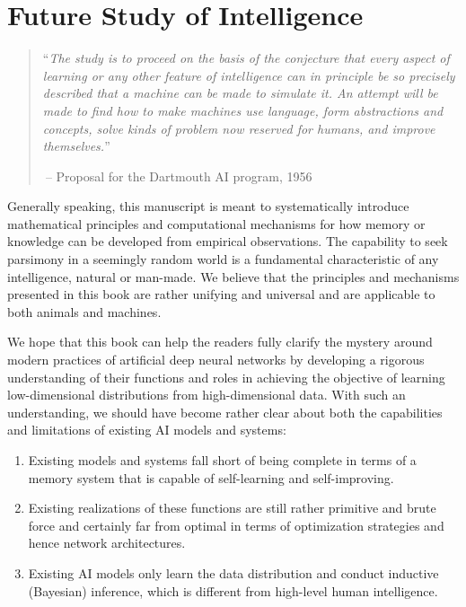 \documentclass[../../book-main.tex]{subfiles}
\begin{document}
\chapter{Future Study of Intelligence}
\label{ch:future}


  

\begin{quote}
``{\em The study is to proceed on the basis of the conjecture that every aspect of learning or any other feature of intelligence can in principle be so precisely described that a machine can be made to simulate it. An attempt will be made to find how to make machines use language, form abstractions and concepts, solve kinds of problem now reserved for humans, and improve themselves.}''

$~$\hfill -- Proposal for the Dartmouth AI program, 1956
 \end{quote}
\vspace{5mm}


Generally speaking, this manuscript is meant to systematically introduce mathematical principles and computational mechanisms for how memory or knowledge can be developed from empirical observations. The capability to seek parsimony in a seemingly random world is a fundamental characteristic of any intelligence, natural or man-made. We believe that the principles and mechanisms presented in this book are rather unifying and universal and are applicable to both animals and machines. 

We hope that this book can help the readers fully clarify the mystery around modern practices of artificial deep neural networks by developing a rigorous understanding of their functions and roles in achieving the objective of learning low-dimensional distributions from high-dimensional data. With such an understanding, we should have become rather clear about both the capabilities and limitations of existing AI models and systems: 
\begin{enumerate}
    \item Existing models and systems fall short of being complete in terms of a memory system that is capable of self-learning and self-improving.
    \item Existing realizations of these functions are still rather primitive and brute force and certainly far from optimal in terms of optimization strategies and hence network architectures. 
    \item Existing AI models only learn the data distribution and conduct inductive (Bayesian) inference, which is different from high-level human intelligence.
\end{enumerate} 
\end{document}
